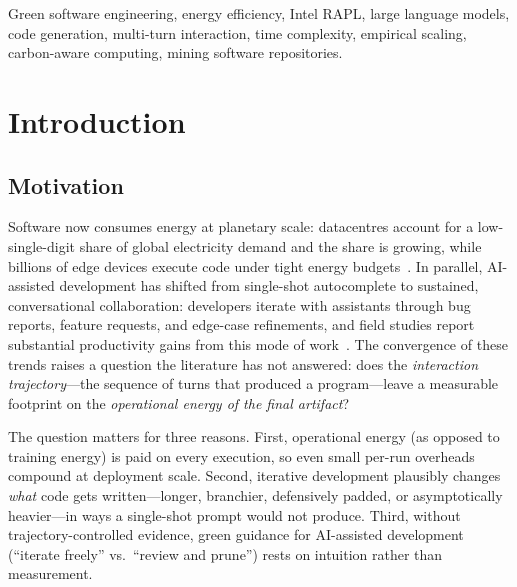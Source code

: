 \documentclass[journal]{IEEEtran}
\begin{document}
\begin{IEEEkeywords}
Green software engineering, energy efficiency, Intel RAPL, large language
models, code generation, multi-turn interaction, time complexity, empirical
scaling, carbon-aware computing, mining software repositories.
\end{IEEEkeywords}

\section{Introduction}
\subsection{Motivation}
Software now consumes energy at planetary scale: datacentres account for a
low-single-digit share of global electricity demand and the share is
growing, while billions of edge devices execute code under tight energy
budgets~\cite{patterson2021, hotcarbon2022}. In parallel, AI-assisted
development has shifted from single-shot autocomplete to sustained,
conversational collaboration: developers iterate with assistants through bug
reports, feature requests, and edge-case refinements, and field studies
report substantial productivity gains from this mode of
work~\cite{peng2023}. The convergence of these trends raises a question the
literature has not answered: does the \emph{interaction trajectory}---the
sequence of turns that produced a program---leave a measurable footprint on
the \emph{operational energy of the final artifact}?

The question matters for three reasons. First, operational energy (as
opposed to training energy) is paid on every execution, so even small
per-run overheads compound at deployment scale. Second, iterative
development plausibly changes \emph{what} code gets written---longer,
branchier, defensively padded, or asymptotically heavier---in ways a
single-shot prompt would not produce. Third, without trajectory-controlled
evidence, green guidance for AI-assisted development (``iterate freely'' vs.\
``review and prune'') rests on intuition rather than measurement.
\end{document}
